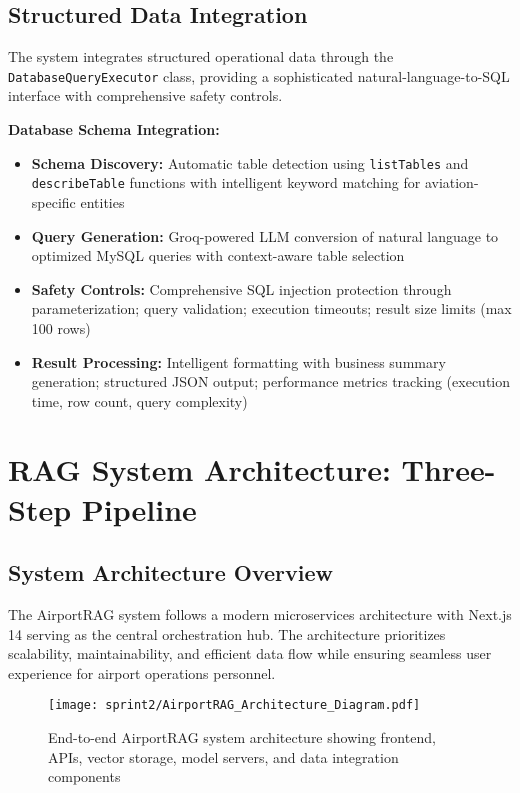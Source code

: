 \subsection{Structured Data Integration}
\label{subsec:structured_data_s2}

The system integrates structured operational data through the \texttt{DatabaseQueryExecutor} class, providing a sophisticated natural-language-to-SQL interface with comprehensive safety controls.

\textbf{Database Schema Integration:}
\begin{itemize}
    \item \textbf{Schema Discovery:} Automatic table detection using \texttt{listTables} and \texttt{describeTable} functions with intelligent keyword matching for aviation-specific entities
    \item \textbf{Query Generation:} Groq-powered LLM conversion of natural language to optimized MySQL queries with context-aware table selection
    \item \textbf{Safety Controls:} Comprehensive SQL injection protection through parameterization; query validation; execution timeouts; result size limits (max 100 rows)
    \item \textbf{Result Processing:} Intelligent formatting with business summary generation; structured JSON output; performance metrics tracking (execution time, row count, query complexity)
\end{itemize}

\section{RAG System Architecture: Three-Step Pipeline}
\label{sec:modeling_s2}

\subsection{System Architecture Overview}
\label{subsec:architecture_s2}

The AirportRAG system follows a modern microservices architecture with Next.js 14 serving as the central orchestration hub. The architecture prioritizes scalability, maintainability, and efficient data flow while ensuring seamless user experience for airport operations personnel.

\begin{figure}[H]
\centering
\texttt{[image: sprint2/AirportRAG\_Architecture\_Diagram.pdf]}
\caption{End-to-end AirportRAG system architecture showing frontend, APIs, vector storage, model servers, and data integration components}
\label{fig:system_arch_s2}
\end{figure}

